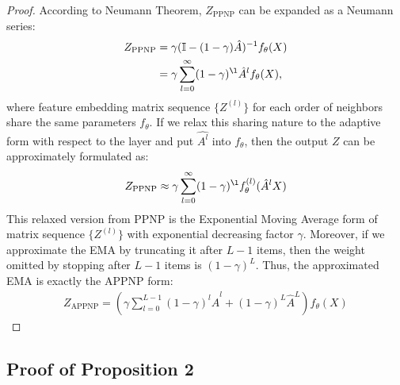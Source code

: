 \documentclass{article} \usepackage{iclr2021_conference,times}
\begin{document}
\begin{proof}
	According to Neumann Theorem, $Z_{\text{PPNP}}$ can be expanded as a Neumann series:
	\begin{equation}
	\begin{aligned}
	Z_{\text{PPNP}}&=\gamma (\mathbb{I} - (1-\gamma)\hat{A})^{-1}f_{\theta}(X)\\
	&=\gamma \sum_{l=0}^{\infty}(1-\gamma)^{\l}\hat{A}^l f_{\theta}(X), \nonumber
	\end{aligned}
	\end{equation}
	where feature embedding matrix sequence $\{Z^{(l)}\}$ for each order of neighbors share the same parameters $f_{\theta}$. If we relax this sharing nature to the adaptive form with respect to the layer and put $\hat{A^l}$ into $f_{\theta}$, then the output $Z$ can be approximately formulated as:
	\begin{equation}
	\begin{aligned}
	Z_{\text{PPNP}} \approx \gamma \sum_{l=0}^{\infty}(1-\gamma)^{\l}f_{\theta}^{(l)}(\hat{A}^l X) \nonumber
	\end{aligned} 
	\end{equation}
	This relaxed version from PPNP is the Exponential Moving Average form of matrix sequence $\{Z^{(l)}\}$ with exponential decreasing factor $\gamma$. Moreover, if we approximate the EMA by truncating it after $L-1$ items, then the weight omitted by stopping after $L-1$ items is $(1-\gamma)^L$. Thus, the approximated EMA is exactly the APPNP form:
	\begin{equation}
	\begin{aligned}
	Z_{\text{APPNP}}= (\gamma \sum_{l=0}^{L-1}(1-\gamma)^l \hat{A}^l + (1-\gamma)^L \hat{A}^L)f_{\theta}(X) \nonumber
	\end{aligned}
	\end{equation}
\end{proof}

\subsection{Proof of Proposition 2} \label{sec: proof_theorem2}
\end{document}
